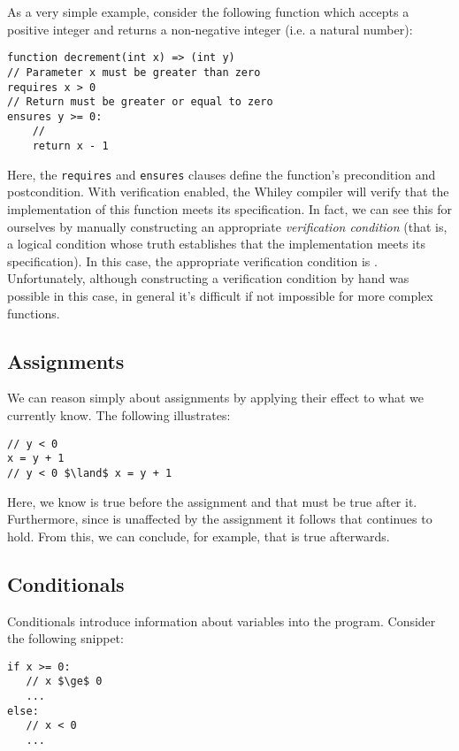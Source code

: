 As a very simple example, consider the following function which accepts a positive integer and returns a
non-negative integer (i.e. a natural number):
\begin{lstlisting}
function decrement(int x) => (int y) 
// Parameter x must be greater than zero
requires x > 0
// Return must be greater or equal to zero
ensures y >= 0:
    //
    return x - 1
\end{lstlisting}
Here, the \lstinline{requires} and \lstinline{ensures} clauses define the function's precondition and postcondition.  With verification enabled, the Whiley compiler will verify that the implementation of this function meets its specification.  In fact, we can see this for ourselves by manually constructing an appropriate {\em verification condition} (that is, a logical condition whose truth establishes that the implementation meets its specification).  In this case, the appropriate verification condition is .  Unfortunately, although constructing a verification condition by hand was possible in this case, in general it's difficult if not impossible for more complex functions.

\subsection{Assignments}

We can reason simply about assignments by applying their effect to what we currently know.  The following illustrates:

\begin{lstlisting}
// y < 0 
x = y + 1
// y < 0 $\land$ x = y + 1
\end{lstlisting}

Here, we know  is true before the assignment and that  must be true after it.  Furthermore, since  is unaffected by the assignment it follows that  continues to hold.  From this, we can conclude, for example, that  is true afterwards.  

\subsection{Conditionals}

Conditionals introduce information about variables into the program.  Consider the following snippet:

\begin{lstlisting}
if x >= 0:
   // x $\ge$ 0
   ...
else:
   // x < 0
   ...
\end{lstlisting}

